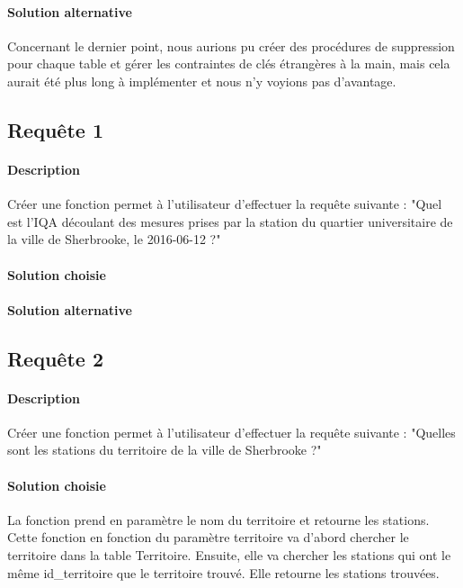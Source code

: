 \documentclass{article}
\begin{document}
\paragraph{Solution alternative}
Concernant le dernier point, nous aurions pu créer des procédures de suppression pour chaque table
et gérer les contraintes de clés étrangères à la main, mais cela aurait été plus long à implémenter
et nous n'y voyions pas d'avantage.

\subsection{Requête 1}
\paragraph{Description} Créer une fonction permet à l'utilisateur
d'effectuer la requête suivante : "Quel est l'IQA découlant des mesures
prises par la station du quartier universitaire de la ville de Sherbrooke,
le 2016-06-12 ?"

\paragraph{Solution choisie}

\paragraph{Solution alternative}

\subsection{Requête 2}
\paragraph{Description} Créer une fonction permet à l'utilisateur
d'effectuer la requête suivante : "Quelles sont les stations du territoire
de la ville de Sherbrooke ?"

\paragraph{Solution choisie}
La fonction prend en paramètre le nom du territoire et retourne les stations. Cette fonction en fonction du paramètre territoire va d'abord chercher le territoire dans la table Territoire. Ensuite, elle va chercher les stations qui ont le même id\_territoire que le territoire trouvé. Elle retourne les stations trouvées.
\end{document}
